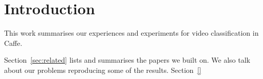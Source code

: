\section{Introduction}
\label{sec:introduction}

This work summarises our experiences and experiments for video classification in Caffe.

Section~\ref{sec:related} lists and summarises the papers we built on.
We also talk about our problems reproducing some of the results.
Section~\ref{}

